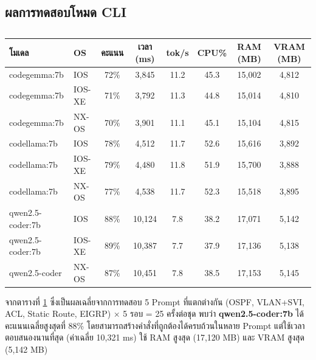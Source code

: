 \subsection{ผลการทดสอบโหมด CLI}

\begin{table}[H]
    \caption{}
    \label{tab:benchmark-cli}
    \fontSixTeen
    \centering
    \begin{tabularx}{\textwidth}{|l|l|c|c|c|c|c|c|}
        \hline
        \textbf{โมเดล} & \textbf{OS} & \textbf{คะแนน} & \textbf{เวลา (ms)} & \textbf{tok/s} & \textbf{CPU\%} & \textbf{RAM (MB)} & \textbf{VRAM (MB)} \\
        \hline
        codegemma:7b & IOS & 72\% & 3,845 & 11.2 & 45.3 & 15,002 & 4,812 \\
        \hline
        codegemma:7b & IOS-XE & 71\% & 3,792 & 11.3 & 44.8 & 15,014 & 4,810 \\
        \hline
        codegemma:7b & NX-OS & 70\% & 3,901 & 11.1 & 45.1 & 15,104 & 4,815 \\
        \hline
        codellama:7b & IOS & 78\% & 4,512 & 11.7 & 52.6 & 15,616 & 3,892 \\
        \hline
        codellama:7b & IOS-XE & 79\% & 4,480 & 11.8 & 51.9 & 15,700 & 3,888 \\
        \hline
        codellama:7b & NX-OS & 77\% & 4,538 & 11.7 & 52.3 & 15,518 & 3,895 \\
        \hline
        qwen2.5-coder:7b & IOS & 88\% & 10,124 & 7.8 & 38.2 & 17,071 & 5,142 \\
        \hline
        qwen2.5-coder:7b & IOS-XE & 89\% & 10,387 & 7.7 & 37.9 & 17,136 & 5,138 \\
        \hline
        qwen2.5-coder & NX-OS & 87\% & 10,451 & 7.8 & 38.5 & 17,153 & 5,145 \\
        \hline
    \end{tabularx}
\end{table}

\hspace*{1.3em}
จากตารางที่ \ref{tab:benchmark-cli} ซึ่งเป็นผลเฉลี่ยจากการทดสอบ 5 Prompt ที่แตกต่างกัน (OSPF, VLAN+SVI, ACL, Static Route, EIGRP) $\times$ 5 รอบ = 25 ครั้งต่อชุด พบว่า \textbf{qwen2.5-coder:7b} ได้คะแนนเฉลี่ยสูงสุดที่ 88\% โดยสามารถสร้างคำสั่งที่ถูกต้องได้ครบถ้วนในหลาย Prompt แต่ใช้เวลาตอบสนองนานที่สุด (ค่าเฉลี่ย 10,321 ms) ใช้ RAM สูงสุด (17,120 MB) และ VRAM สูงสุด (5,142 MB)

